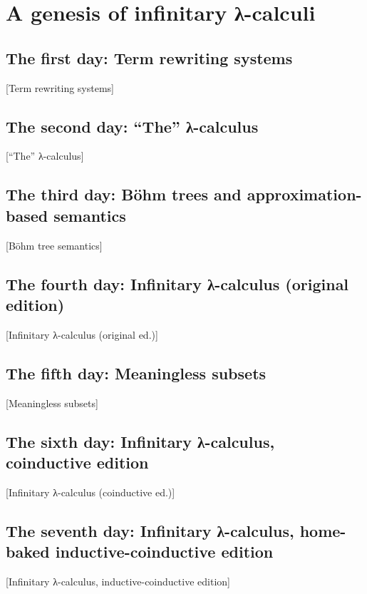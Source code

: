 \chapter{A genesis of infinitary λ-calculi}
\label{chap:lambda}
\margintoc


\section{The first day: Term rewriting systems}%
[Term rewriting systems]

\lipsum[1]


\section{The second day: \enquote{The} λ-calculus}%
[\enquote{The} λ-calculus]

\lipsum[2]


\section{The third day: Böhm trees and approximation-based semantics}%
[Böhm tree semantics]

\lipsum[3]


\section{The fourth day: Infinitary λ-calculus (original edition)}%
[Infinitary λ-calculus (original ed.)]

\lipsum[4]


\section{The fifth day: Meaningless subsets}%
[Meaningless subsets]

\lipsum[5]


\section{The sixth day: Infinitary λ-calculus, coinductive edition}%
[Infinitary λ-calculus (coinductive ed.)]

\lipsum[6]


\section{The seventh day: Infinitary λ-calculus, home-baked 
inductive-coinductive edition}%
[Infinitary λ-calculus, inductive-coinductive edition]

\lipsum[7]
